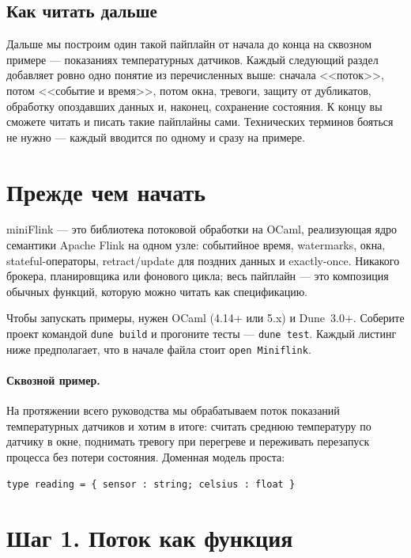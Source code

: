 \documentclass[11pt,a4paper]{article}
\begin{document}
\subsection{Как читать дальше}

Дальше мы построим один такой пайплайн от начала до конца на сквозном
примере --- показаниях температурных датчиков. Каждый следующий раздел
добавляет ровно одно понятие из перечисленных выше: сначала
<<поток>>, потом <<событие и время>>, потом окна, тревоги, защиту от
дубликатов, обработку опоздавших данных и, наконец, сохранение
состояния. К концу вы сможете читать и писать такие пайплайны сами.
Технических терминов бояться не нужно --- каждый вводится по одному и
сразу на примере.

\section{Прежде чем начать}

miniFlink --- это библиотека потоковой обработки на OCaml,
реализующая ядро семантики Apache Flink на одном узле: событийное
время, watermarks, окна, stateful-операторы, retract/update для
поздних данных и exactly-once. Никакого брокера, планировщика или
фонового цикла; весь пайплайн --- это композиция обычных функций,
которую можно читать как спецификацию.

Чтобы запускать примеры, нужен OCaml (4.14+ или 5.x) и Dune~3.0+.
Соберите проект командой \texttt{dune build} и прогоните тесты ---
\texttt{dune test}. Каждый листинг ниже предполагает, что в начале
файла стоит \texttt{open Miniflink}.

\paragraph{Сквозной пример.} На протяжении всего руководства мы
обрабатываем поток показаний температурных датчиков и хотим в итоге:
считать среднюю температуру по датчику в окне, поднимать тревогу при
перегреве и переживать перезапуск процесса без потери состояния.
Доменная модель проста:

\begin{lstlisting}
type reading = { sensor : string; celsius : float }
\end{lstlisting}

\section{Шаг 1. Поток как функция}
\end{document}

